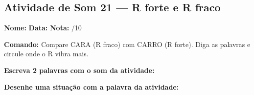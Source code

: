 \subsection{Atividade de Som 21 --- R forte e R fraco}
\begin{exercicio}



\noindent\textbf{Nome:} \underline{\hspace{3.2cm}} \quad \textbf{Data:} \underline{\hspace{1.6cm}} \quad \textbf{Nota:} \underline{\hspace{0.9cm}}/10


\noindent\textbf{Comando:} Compare CARA (R fraco) com CARRO (R forte). Diga as palavras e circule onde o R vibra mais.


\begin{center}
\end{center}

\noindent\textbf{Escreva 2 palavras com o som da atividade:}

\begin{center}
  \underline{\hspace{3cm}} \quad \underline{\hspace{3cm}}
\end{center}

\noindent\textbf{Desenhe uma situação com a palavra da atividade:}

\begin{center}
\end{center}

\end{exercicio}



